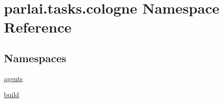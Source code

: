 \hypertarget{namespaceparlai_1_1tasks_1_1cologne}{}\section{parlai.\+tasks.\+cologne Namespace Reference}
\label{namespaceparlai_1_1tasks_1_1cologne}
\subsection*{Namespaces}
\begin{DoxyCompactItemize}
\item 
 \hyperlink{namespaceparlai_1_1tasks_1_1cologne_1_1agents}{agents}
\item 
 \hyperlink{namespaceparlai_1_1tasks_1_1cologne_1_1build}{build}
\end{DoxyCompactItemize}
